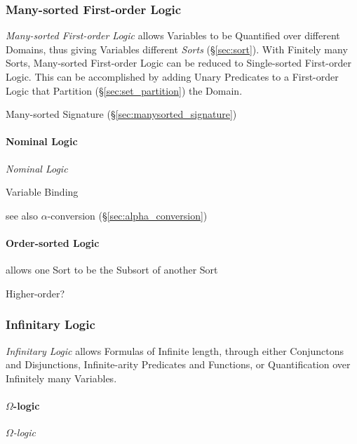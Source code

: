 \subsubsection{Many-sorted First-order Logic}
\label{sec:manysorted_logic}

\emph{Many-sorted First-order Logic} allows Variables to be Quantified
over different Domains, thus giving Variables different \emph{Sorts}
(\S\ref{sec:sort}). With Finitely many Sorts, Many-sorted First-order
Logic can be reduced to Single-sorted First-order Logic. This can be
accomplished by adding Unary Predicates to a First-order Logic that
Partition (\S\ref{sec:set_partition}) the Domain.

Many-sorted Signature (\S\ref{sec:manysorted_signature})



\paragraph{Nominal Logic}\label{sec:nominal_logic}\hfill
\emph{Nominal Logic}

Variable Binding

see also $\alpha$-conversion (\S\ref{sec:alpha_conversion})



\paragraph{Order-sorted Logic}\label{sec:order_sorted}\hfill

allows one Sort to be the Subsort of another Sort

Higher-order?



\subsubsection{Infinitary Logic}\label{sec:infinitary_logic}

\emph{Infinitary Logic} allows Formulas of Infinite length, through
either Conjunctons and Disjunctions, Infinite-arity Predicates and
Functions, or Quantification over Infinitely many Variables.



\paragraph{$\Omega$-logic}\label{sec:omega_logic}\hfill

\emph{$\Omega$-logic}



